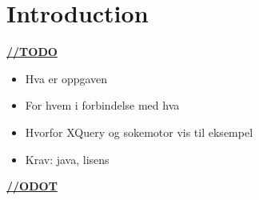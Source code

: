 \chapter{Introduction}
\underline{\textbf{\LARGE //TODO}}


\begin{itemize}
\item Hva er oppgaven
\item For hvem i forbindelse med hva
\item Hvorfor XQuery og sokemotor vis til eksempel
\item Krav: java, lisens
\end{itemize}

\underline{\textbf{\LARGE //ODOT}}